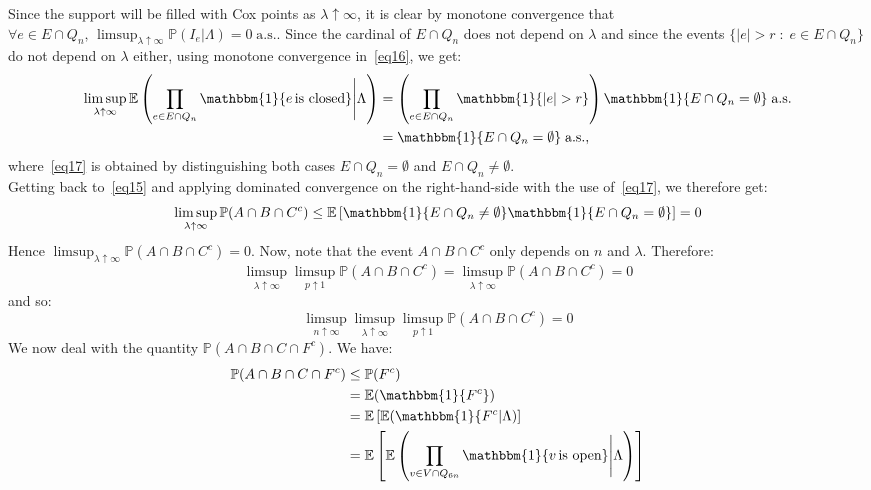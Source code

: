 \documentclass[10pt,a4paper]{amsart}
\theoremstyle{exampstyle}
\theoremstyle{exampnotations}
\begin{document}
Since the support will be filled with Cox points as $\lambda \uparrow \infty$, it is clear by monotone convergence that $\displaystyle \forall e \in E \cap Q_n, \, \limsup_{\lambda \uparrow \infty} \mathbb{P}(I_e \vert \Lambda) = 0 \; \text{a.s.}$. Since the cardinal of $E \cap Q_n$ does not depend on $\lambda$ and since the events $\lbrace \vert e \vert > r \; : \; e \in E \cap Q_n \rbrace$ do not depend on $\lambda$ either, using monotone convergence in~\eqref{eq16}, we get:
\begin{align}
   \nonumber  \limsup_{\lambda \uparrow \infty} \mathbb{E}\left( \prod_{e \in E \cap Q_n} \mathbbm{1} \lbrace e \, \text{is closed} \rbrace \Bigg\vert \Lambda \right) &= \left(\prod_{e \in E \cap Q_n} \mathbbm{1} \lbrace \vert e \vert > r \rbrace \right) \mathbbm{1}\lbrace E \cap Q_n = \emptyset \rbrace \; \text{a.s.}
   \\ \label{eq17} &= \mathbbm{1} \lbrace E \cap Q_n = \emptyset \rbrace \; \text{a.s.},
\end{align}
where~\eqref{eq17} is obtained by distinguishing both cases $E \cap Q_n = \emptyset$ and $E \cap Q_n \neq \emptyset$. \\
Getting back to~\eqref{eq15} and applying dominated convergence on the right-hand-side with the use of~\eqref{eq17}, we therefore get:
\begin{equation*}
  \limsup_{\lambda \uparrow \infty} \mathbb{P}(A \cap B \cap C^c) \leq \mathbb{E}\left[\mathbbm{1}\lbrace E \cap Q_n \neq \emptyset \rbrace \mathbbm{1} \lbrace E \cap Q_n = \emptyset \rbrace \right] = 0  
\end{equation*}
Hence $\limsup_{\lambda \uparrow \infty} \mathbb{P}(A \cap B \cap C^c) = 0$. Now, note that the event $A \cap B \cap C^c$ only depends on $n$ and $\lambda$. Therefore:
\begin{equation*}
   \limsup_{\lambda \uparrow \infty}\limsup_{p \uparrow 1} \mathbb{P}(A \cap B \cap C^c) = \limsup_{\lambda \uparrow \infty} \mathbb{P}(A \cap B \cap C^c) = 0
\end{equation*}
and so:
\begin{equation}
    \label{eq18}
    \limsup_{n \uparrow \infty}\limsup_{\lambda \uparrow \infty}\limsup_{p \uparrow 1} \mathbb{P}(A \cap B \cap C^c) = 0
\end{equation}
We now deal with the quantity $\mathbb{P}(A \cap B \cap C \cap F^c)$. We have:
\begin{align*}
    \mathbb{P}(A \cap B \cap C \cap F^c) &\leq \mathbb{P}(F^{c})
    \\ &= \mathbb{E}(\mathbbm{1}\lbrace F^c \rbrace)
    \\ &= \mathbb{E}\left[\mathbb{E}(\mathbbm{1}\lbrace F^c \vert \Lambda ) \right]
    \\ &= \mathbb{E}\left[\mathbb{E}\left( \prod_{v \in V \cap Q_{6n}} \mathbbm{1}\lbrace v \, \text{is open} \rbrace \Bigg\vert \Lambda \right)\right]
\end{align*}
\end{document}
